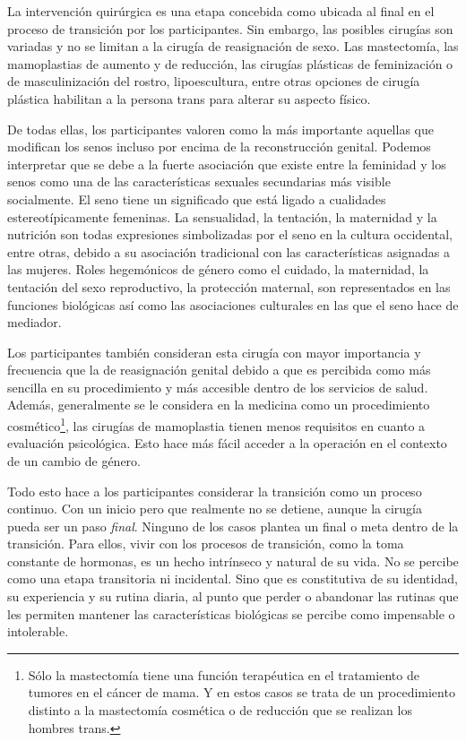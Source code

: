 La intervención quirúrgica es una etapa concebida como ubicada al final en el
proceso de transición por los participantes. Sin embargo, las posibles cirugías
son variadas y no se limitan a la cirugía de reasignación de sexo. Las
mastectomía, las mamoplastias de aumento y de reducción, las cirugías plásticas
de feminización o de masculinización del rostro, lipoescultura, entre otras
opciones de cirugía plástica habilitan a la persona trans para alterar su
aspecto físico.

De todas ellas, los participantes valoren como la más importante aquellas que
modifican los senos incluso por encima de la reconstrucción genital. Podemos
interpretar que se debe a la fuerte asociación que existe entre la feminidad y
los senos como una de las características sexuales secundarias más visible
socialmente. El seno tiene un significado que está ligado a cualidades
estereotípicamente femeninas. La sensualidad, la tentación, la maternidad y la
nutrición son todas expresiones simbolizadas por el seno en la cultura
occidental, entre otras, debido a su asociación tradicional con las
características asignadas a las mujeres. Roles hegemónicos de género como el
cuidado, la maternidad, la tentación del sexo reproductivo, la protección
maternal, son representados en las funciones biológicas así como las
asociaciones culturales en las que el seno hace de mediador.

Los participantes también consideran esta cirugía con mayor importancia y
frecuencia que la de reasignación genital debido a que es percibida como más
sencilla en su procedimiento y más accesible dentro de los servicios de salud.
Además, generalmente se le considera en la medicina como un procedimiento
cosmético\footnote{Sólo la mastectomía tiene una función terapéutica en el
tratamiento de tumores en el cáncer de mama. Y en estos casos se trata de un
procedimiento distinto a la mastectomía cosmética o de reducción que se realizan
los hombres trans.}, las cirugías de mamoplastia tienen menos requisitos en
cuanto a evaluación psicológica. Esto hace más fácil acceder a la operación en
el contexto de un cambio de género.

Todo esto hace a los participantes considerar la transición como un proceso
continuo. Con un inicio pero que realmente no se detiene, aunque la cirugía
pueda ser un paso \emph{final}. Ninguno de los casos plantea un final o meta
dentro de la transición. Para ellos, vivir con los procesos de transición, como
la toma constante de hormonas, es un hecho intrínseco y natural de su vida. No
se percibe como una etapa transitoria ni incidental. Sino que es constitutiva de
su identidad, su experiencia y su rutina diaria, al punto que perder o abandonar
las rutinas que les permiten mantener las características biológicas se percibe
como impensable o intolerable.

